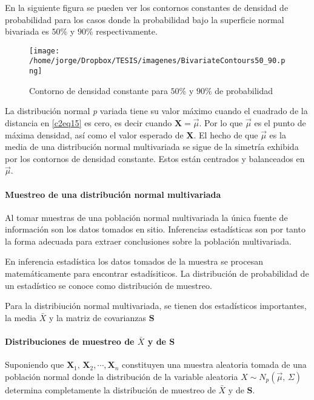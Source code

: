 \documentclass[english]{report}
\begin{document}
\vspace{5pt}

En la siguiente figura se pueden ver los contornos constantes de densidad de probabilidad para los casos donde la probabilidad bajo la superficie normal bivariada es $50\%$ y $90\%$ respectivamente.

\begin{figure}[H]
\centering
\texttt{[image: /home/jorge/Dropbox/TESIS/imagenes/BivariateContours50\_90.png]}
\caption{Contorno de densidad constante para $50\%$ y $90\%$ de probabilidad}
\label{c2f6}
\end{figure}
  

La distribución normal \emph{p} variada tiene su valor máximo cuando el cuadrado de la distancia en \ref{c2eq15} es cero, es decir cuando $\textbf{X}=\vec{\mu}$. Por lo que $\vec{\mu}$ es el punto de máxima densidad, así como el valor esperado de \textbf{X}. El hecho de que $\vec{\mu}$ es la media de una distribución normal multivariada se sigue de la simetría exhibida por los contornos de densidad constante. Estos están centrados y balanceados en $\vec{\mu}$.


\paragraph{Muestreo de una distribución normal multivariada}

Al tomar muestras de una población normal multivariada la única fuente de información son los datos tomados en sitio. Inferencias estadísticas son por tanto la forma adecuada para extraer conclusiones sobre la población multivariada.

En inferencia estadística los datos tomados de la muestra se procesan matemáticamente para encontrar estadísiticos. La distribución de probabilidad de un estadístico se conoce como distribución de muestreo. 

Para la distribiución normal multivariada, se tienen dos estadísticos importantes, la media $\bar{X}$ y la matriz de covarianzas $\textbf{S}$ 


\paragraph{Distribuciones de muestreo de $\bar{X}$ y de $\textbf{S}$}

Suponiendo que  $\textbf{X}_1,\,\textbf{X}_2,\cdots,\textbf{X}_n$ constituyen una muestra aleatoria tomada de una población normal donde la distribución de la variable aleatoria $X \sim N_p(\vec{\mu},\,\Sigma)$ determina completamente la distribución de muestreo de $\bar{X}$ y de $\textbf{S}$.
\end{document}
